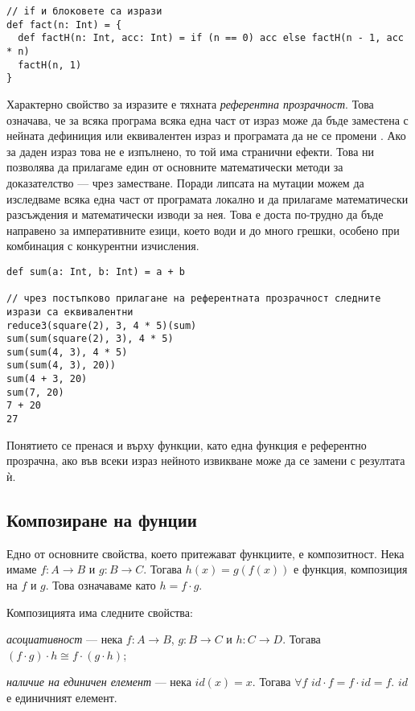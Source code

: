 \begin{lstlisting}[texcl=true]
// if и блоковете са изрази
def fact(n: Int) = {
  def factH(n: Int, acc: Int) = if (n == 0) acc else factH(n - 1, acc * n)
  factH(n, 1)
}
\end{lstlisting}

Характерно свойство за изразите е тяхната \emph{референтна прозрачност}. Това означава, че за всяка програма всяка една част от израз може да бъде заместена с нейната дефиниция или еквивалентен израз и програмата да не се промени \cite{chiusano2014FPinScala}. Ако за даден израз това не е изпълнено, то той има странични ефекти. Това ни позволява да прилагаме един от основните математически методи за доказателство — чрез заместване. Поради липсата на мутации можем да изследваме всяка една част от програмата локално и да прилагаме математически разсъждения и математически изводи за нея. Това е доста по-трудно да бъде направено за императивните езици, което води и до много грешки, особено при комбинация с конкурентни изчисления.

\begin{lstlisting}[texcl=true]
def sum(a: Int, b: Int) = a + b

// чрез постъпково прилагане на референтната прозрачност следните изрази са еквивалентни
reduce3(square(2), 3, 4 * 5)(sum)
sum(sum(square(2), 3), 4 * 5)
sum(sum(4, 3), 4 * 5)
sum(sum(4, 3), 20))
sum(4 + 3, 20)
sum(7, 20)
7 + 20
27
\end{lstlisting}

Понятието се пренася и върху функции, като една функция е референтно прозрачна, ако във всеки израз нейното извикване може да се замени с резултата ѝ.

\subsection{Композиране на фунции}

Едно от основните свойства, което притежават функциите, е композитност. Нека имаме $f: A \rightarrow B$ и $g: B \rightarrow C$. Тогава $h(x) = g(f(x))$ е функция, композиция на $f$ и $g$. Това означаваме като $h = f \cdot g$.

Композицията има следните свойства:

\begin{itemize*}
 \item \emph{асоциативност} — нека $f: A \rightarrow B$, $g: B \rightarrow C$ и $h: C \rightarrow D$. Тогава $(f \cdot g) \cdot h \cong f \cdot (g \cdot h)$;
 \item \emph{наличие на единичен елемент} — нека $id(x) = x$. Тогава $\forall f$ $id \cdot f = f \cdot id = f$. $id$ е единичният елемент.
\end{itemize*}

